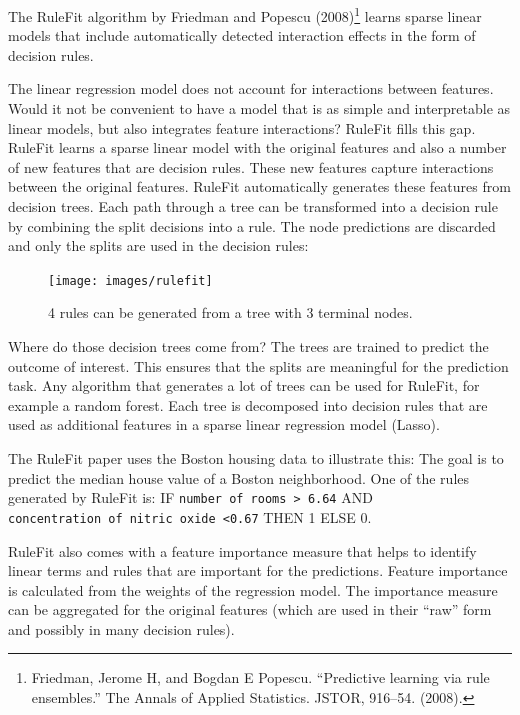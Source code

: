 \documentclass[12pt,]{krantz}
\begin{document}
The RuleFit algorithm by Friedman and Popescu (2008)\footnote{Friedman,
  Jerome H, and Bogdan E Popescu. ``Predictive learning via rule
  ensembles.'' The Annals of Applied Statistics. JSTOR, 916--54. (2008).}
learns sparse linear models that include automatically detected
interaction effects in the form of decision rules.

The linear regression model does not account for interactions between
features. Would it not be convenient to have a model that is as simple
and interpretable as linear models, but also integrates feature
interactions? RuleFit fills this gap. RuleFit learns a sparse linear
model with the original features and also a number of new features that
are decision rules. These new features capture interactions between the
original features. RuleFit automatically generates these features from
decision trees. Each path through a tree can be transformed into a
decision rule by combining the split decisions into a rule. The node
predictions are discarded and only the splits are used in the decision
rules:

\begin{figure}

{\centering \texttt{[image: images/rulefit]} 

}

\caption{4 rules can be generated from a tree with 3 terminal nodes.}\label{fig:rulefit-split}
\end{figure}

Where do those decision trees come from? The trees are trained to
predict the outcome of interest. This ensures that the splits are
meaningful for the prediction task. Any algorithm that generates a lot
of trees can be used for RuleFit, for example a random forest. Each tree
is decomposed into decision rules that are used as additional features
in a sparse linear regression model (Lasso).

The RuleFit paper uses the Boston housing data to illustrate this: The
goal is to predict the median house value of a Boston neighborhood. One
of the rules generated by RuleFit is: IF
\texttt{number\ of\ rooms\ \textgreater{}\ 6.64} AND
\texttt{concentration\ of\ nitric\ oxide\ \textless{}0.67} THEN 1 ELSE
0.

RuleFit also comes with a feature importance measure that helps to
identify linear terms and rules that are important for the predictions.
Feature importance is calculated from the weights of the regression
model. The importance measure can be aggregated for the original
features (which are used in their ``raw'' form and possibly in many
decision rules).
\end{document}

